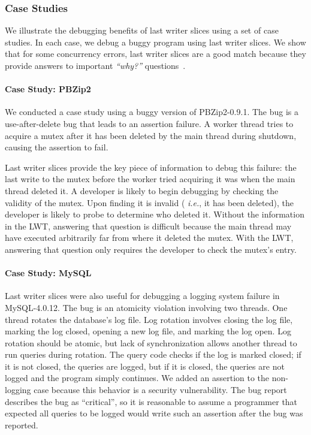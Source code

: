 \documentclass[preprint,9pt]{sigplanconf}
\newcommand{\lwt}{LWT\xspace}
\begin{document}
\subsubsection{Case Studies}

We illustrate the debugging benefits of last writer slices using a set of case
studies.  In each case, we debug a buggy program using last writer slices.  We
show that for some concurrency errors, last writer slices are a good match
because they provide answers to important {\em ``why?''}
questions~\cite{whylineicse}.  

\paragraph{Case Study: PBZip2}
We conducted a case study using a buggy version of PBZip2-0.9.1.    The bug is
a use-after-delete bug that leads to an assertion failure.  A worker thread
tries to acquire a mutex after it has been deleted by the main thread during
shutdown, causing the assertion to fail.  

Last writer slices provide the key piece of information to debug this failure: the last
write to the mutex before the worker tried acquiring it was when the main
thread deleted it.  A developer is likely to begin debugging by checking the
validity of the mutex.  Upon finding it is invalid ({\em
i.e.}, it has been deleted), the developer is likely to probe to determine who 
deleted it.  Without the information in the \lwt, answering that question is difficult
because the main thread may have executed arbitrarily far from where it deleted
the mutex.  With the \lwt, answering that question only requires the developer
to check the mutex's entry.


\paragraph{Case Study: MySQL}
Last writer slices were also useful for debugging a logging system failure in
MySQL-4.0.12.  The bug is an atomicity violation involving two threads.  One
thread rotates the database's log file.  Log rotation involves closing the log
file, marking the log closed, opening a new log file, and marking the log open.
Log rotation should be atomic, but lack of synchronization allows another
thread to run queries during rotation.  The query code checks if the log is
marked closed; if it is not closed, the queries are logged, but if it is
closed, the queries are not logged and the program simply continues.  We added
an assertion to the non-logging case because this behavior is a security
vulnerability.  The bug report describes the bug as ``critical'', so it is
reasonable to assume a programmer that expected all queries to be logged would
write such an assertion after the bug was reported.
\end{document}
